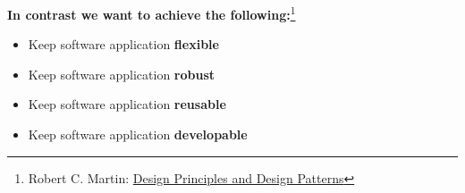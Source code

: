 \documentclass[calcdimensions,landscape,letterpaper]{powersem}
\newcommand{\thecurrentheading}{}
\newcommand{\heading}[1]{\renewcommand{\thecurrentheading}{#1}}
\begin{document}
\begin{slide}
  \heading{Aims}
  \begin{center}
    \textbf{In contrast we want to achieve the following:}\footnote{Robert C. Martin: \href{https://staff.cs.utu.fi/~jounsmed/doos_06/material/DesignPrinciplesAndPatterns.pdf}{Design Principles and Design Patterns}}\medskip\\
    \begin{minipage}[c]{.65\textwidth}
      \begin{itemize}
        \item Keep software application \textbf{flexible}
        \item Keep software application \textbf{robust}
        \item Keep software application \textbf{reusable}
        \item Keep software application \textbf{developable}
      \end{itemize}
    \end{minipage}
  \end{center}
\end{slide}
\end{document}
